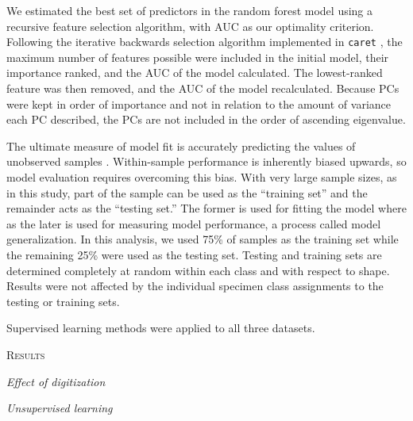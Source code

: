 \documentclass[12pt,letterpaper]{article}
\renewcommand{\section}[1]{%
\bigskip
\begin{center}
\begin{Large}
\normalfont\scshape #1
\medskip
\end{Large}
\end{center}}
\renewcommand{\subsection}[1]{%
\bigskip
\begin{center}
\begin{large}
\normalfont\itshape #1
\end{large}
\end{center}}
\begin{document}
We estimated the best set of predictors in the random forest model using a recursive feature selection algorithm, with AUC as our optimality criterion. Following the iterative backwards selection algorithm implemented in \texttt{caret} \citep{KuhnMAN2013}, the maximum number of features possible were included in the initial model, their importance ranked, and the AUC of the model calculated. The lowest-ranked feature was then removed, and the AUC of the model recalculated. Because PCs were kept in order of importance and not in relation to the amount of variance each PC described, the PCs are not included in the order of ascending eigenvalue.

The ultimate measure of model fit is accurately predicting the values of unobserved samples \citep{Hastie2009,Kuhn2013}. Within-sample performance is inherently biased upwards, so model evaluation requires overcoming this bias. With very large sample sizes, as in this study, part of the sample can be used as the ``training set'' and the remainder acts as the ``testing set.'' The former is used for fitting the model where as the later is used for measuring model performance, a process called model generalization. In this analysis, we used 75\% of samples as the training set while the remaining 25\% were used as the testing set. Testing and training sets are determined completely at random within each class and with respect to shape. Results were not affected by the individual specimen class assignments to the testing or training sets.

Supervised learning methods were applied to all three datasets.


\section{Results}

\subsection{Effect of digitization}



\subsection{Unsupervised learning}
\end{document}
